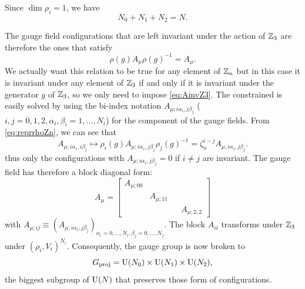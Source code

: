             Since $\dim\rho_i=1$, we have
            \begin{equation}
                N_0+N_1+N_2=N.\label{eq:sumNiZ3}
            \end{equation} 
            
            The gauge field configurations that are left invariant under the action of $\mathbb{Z}_3$ are therefore the ones that satisfy
            \begin{equation}
                \rho(g)A_\mu\rho(g)^{-1}=A_\mu.\label{eq:AinvZ3}
            \end{equation}
            We actually want this relation to be true for any element of $\mathbb{Z}_n$ but in this case it is invariant under any element of $\mathbb{Z}_3$ if and only if it is invariant under the generator $g$ of $\mathbb{Z}_3$, so we only need to impose \eqref{eq:AinvZ3}. The constrained is easily solved by using the bi-index notation $A_{\mu;i\alpha_i,j\beta_j}$ ($i,j=0,1,2,\alpha_i,\beta_i=1,\dots,N_i$) for the component of the gauge fields. From \eqref{eq:reprrhoZn}, we can see that
            \begin{equation}
                A_{\mu;i\alpha_i,i\beta_j}\mapsto \rho_i(g)A_{\mu;i\alpha_i,j\beta_j}\rho_j(g)^{-1}=\zeta^{i-j}_nA_{\mu;i\alpha_i,j\beta_j}.
            \end{equation}
            thus only the configurations with $A_{\mu;i\alpha_i,j\beta_j}=0$ if $i\neq j$ are invariant. The gauge field has therefore a block diagonal form:
            \begin{equation}
                A_\mu=
                \begin{bmatrix}
                    A_{\mu;00} & & \\
                    & A_{\mu;11} & \\
                    & & & A_{\mu;2,2}
                \end{bmatrix}
            \end{equation}
            with $A_{\mu;ij}\equiv (A_{\mu;i\alpha_i,j\beta_j})_{\alpha_i=0,\dots,N_i,\beta_j=0,\dots,N_j}$. The block $A_{ii}$ transforms under $\mathbb{Z}_3$ under $(\rho_i,V_i)^{N_i}$.
            Consequently, the gauge group is now broken to
            \begin{equation}
                G_{\text{proj}}=\text{U}(N_0)\times\text{U}(N_1)\times\text{U}(N_2),
            \end{equation}
            the biggest subgroup of $\text{U}(N)$ that preserves those form of configurations.
            
